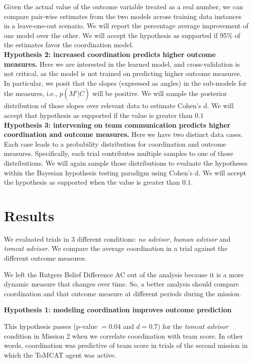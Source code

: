 Given the actual value of the outcome variable treated as a real number, we can
compare pair-wise estimates from the two models across training data instances
in a leave-one-out scenario. We will report the percentage average improvement
of one model over the other. We will accept the hypothesis as supported if 95\%
of the estimates favor the coordination model. \\

\noindent \textbf{Hypothesis 2: increased coordination predicts higher outcome measures.}
Here we are interested in the learned model, and cross-validation is not
critical, as the model is not trained on predicting higher outcome measures.  In
particular, we posit that the slopes (expressed as angles) in the sub-models for the measures, i.e.,
$p(M^i|C)$ will be positive. We will sample the posterior distribution of
those slopes over relevant data to estimate Cohen's d. We will accept that
hypothesis as supported if the value is greater than $0.1$ \\

\noindent \textbf{Hypothesis 3: intervening on team communication predicts
higher coordination and outcome measures.} Here we have two distinct data cases.
Each case leads to a probability distribution for coordination and outcome
measures.  Specifically, each trial contributes multiple samples to one of those
distributions. We will again sample those distributions to evaluate the hypotheses
within the Bayesian hypothesis testing paradigm using Cohen's d. We will accept
the hypothesis as supported when the value is greater than $0.1$.

\section{Results}

We evaluated trials in 3 different conditions: \emph{no advisor}, \emph{human
advisor} and \emph{tomcat advisor}. We compare the average coordination in a
trial against the different outcome measures.

We left the Rutgers Belief Difference AC out of the analysis because it is a
more dynamic measure that changes over time. So, a better analysis should
compare coordination and that outcome measure at different periods during the
mission.

\textbf{Hypothesis 1: modeling coordination improves outcome prediction}

This hypothesis passes (p-value $= 0.04$ and $d = 0.7$) for the \emph{tomcat
advisor} condition in Mission 2 when we correlate coordination with team score.
In other words, coordination was predictive of team score in trials of the
second mission in which the ToMCAT agent was active.

